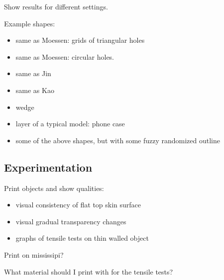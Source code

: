 
Show results for different settings.


Example shapes:
\begin{itemize}
\item same as Moessen: grids of triangular holes
\item same as Moessen: circular holes.
\item same as Jin 
\item same as Kao
\item wedge
\item layer of a typical model: phone case
\item some of the above shapes, but with some fuzzy randomized outline
\end{itemize}





\subsection{Experimentation}
Print objects and show qualities:
\begin{itemize}
\item visual consistency of flat top skin surface
\item visual gradual transparency changes
\item graphs of tensile tests on thin walled object
\end{itemize}

Print on mississipi?

What material should I print with for the tensile tests?









